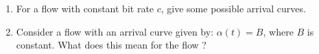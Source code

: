 \begin{problem}
\begin{enumerate}
        \item  For a flow with constant bit rate $c$, give some
        possible arrival curves.
        \item  Consider a flow with an arrival curve given by: $\alpha(t)=B$,
        where $B$ is constant. What does this mean for the flow ?
\end{enumerate}
\end{problem}
